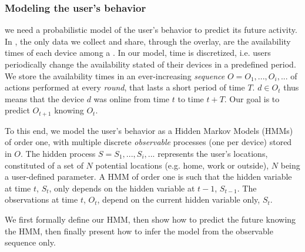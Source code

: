 \subsubsection{Modeling the user's behavior}
\label{sub:a_model_of_the_user_s_behavior}

we need a probabilistic model of the user's behavior to predict its future activity.
In \name, the only data we collect and share, through the \squad overlay, are the availability times of each device among a \squad.
In our model, time is discretized, i.e. users periodically change the availability stated of their devices in a predefined period.
We store the availability times in an ever-increasing \emph{sequence} $O=O_1, ..., O_i, ...$ of actions performed at every \emph{round}, that lasts a short period of time $T$. 
$d \in O_t$ thus means that the device $d$ was online from time $t$ to time $t+T$.
Our goal is to predict $O_{t+1}$ knowing $O_t$.

To this end, we model the user's behavior as a Hidden Markov Models (HMMs) of order one, with multiple discrete \emph{observable} processes (one per device) stored in $O$. 
The hidden process $S=S_1, ..., S_i, ...$ represents the user's locations, constituted of a set of $N$ potential locations (e.g. home, work or outside), $N$ being a user-defined parameter.
A HMM of order one is such that the hidden variable at time $t$, $S_t$, only depends on the hidden variable at $t-1$, $S_{t-1}$.
The observations at time $t$, $O_t$, depend on the current hidden variable only, $S_t$.

We first formally define our HMM, then show how to predict the future knowing the HMM, then finally present how to infer the model from the observable sequence only.



